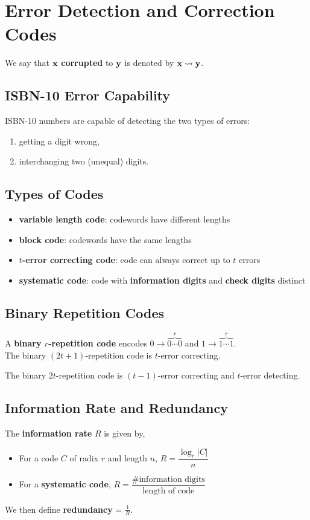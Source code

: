 \section{Error Detection and Correction Codes}

We say that \(\mathbf{x}\) \textbf{corrupted} to \(\mathbf{y}\) is denoted by \(\mathbf{x} \rightsquigarrow \mathbf{y}\).
\subsection{ISBN-10 Error Capability}
ISBN-10 numbers are capable of detecting the two types of errors:
\begin{enumerate}
    \item getting a digit wrong,
    \item interchanging two (unequal) digits.
\end{enumerate}

\subsection{Types of Codes}
\begin{itemize}
    \item \textbf{variable length code}: codewords have different lengths
    \item \textbf{block code}: codewords have the same lengths
    \item \textbf{\(t\)-error correcting code}: code can always correct up to \(t\) errors
    \item \textbf{systematic code}: code with \textbf{information digits} and \textbf{check digits} distinct
\end{itemize}

\subsection{Binary Repetition Codes}
A \textbf{binary \(r\)-repetition code} encodes \(0 \to \overbrace{0 \cdots 0}^r\) and \(1 \to \overbrace{1 \cdots 1}^r\). \\

The binary \((2t + 1)\)-repetition code is \(t\)-error correcting.

The binary \(2t\)-repetition code is \((t- 1)\)-error correcting and \(t\)-error detecting.

\subsection{Information Rate and Redundancy}
The \textbf{information rate} \(R\) is given by,
\begin{itemize}
    \item For a code \(C\) of radix \(r\) and length \(n\), \(R = \dfrac{\log_r|C|}{n}\)
    \item For a \textbf{systematic code}, \(R = \dfrac{\text{\# information digits}}{\text{length of code}}\)
\end{itemize}
We then define \textbf{redundancy} = \(\frac{1}{R}\).

